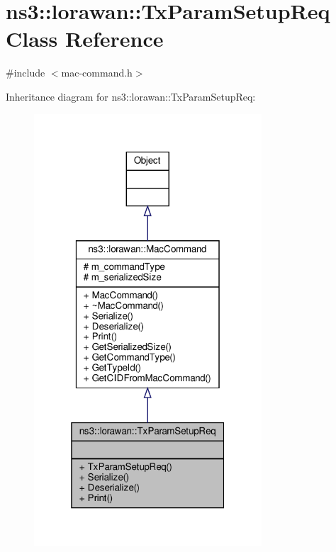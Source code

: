 \hypertarget{classns3_1_1lorawan_1_1TxParamSetupReq}{}\section{ns3\+:\+:lorawan\+:\+:Tx\+Param\+Setup\+Req Class Reference}
\label{classns3_1_1lorawan_1_1TxParamSetupReq}


{\ttfamily \#include $<$mac-\/command.\+h$>$}



Inheritance diagram for ns3\+:\+:lorawan\+:\+:Tx\+Param\+Setup\+Req\+:
\nopagebreak
\begin{figure}[H]
\begin{center}
\leavevmode
\includegraphics[width=241pt]{classns3_1_1lorawan_1_1TxParamSetupReq__inherit__graph}
\end{center}
\end{figure}


